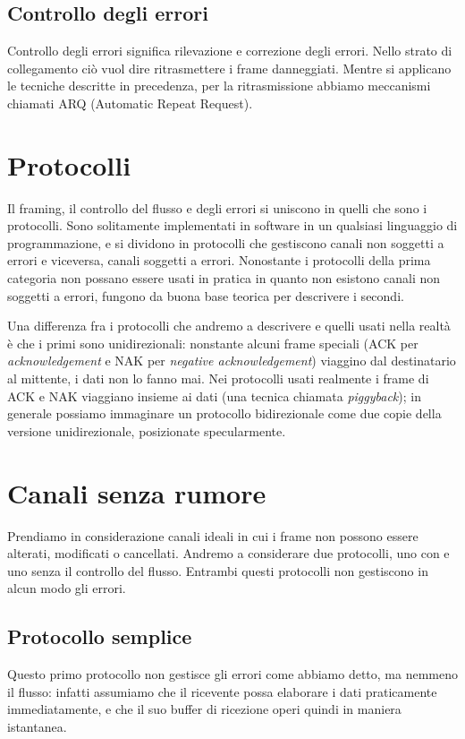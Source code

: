     \subsection{Controllo degli errori}
        Controllo degli errori significa rilevazione e correzione degli errori. Nello strato di collegamento ciò vuol dire ritrasmettere i frame danneggiati. Mentre si applicano le tecniche descritte in precedenza, per la ritrasmissione abbiamo meccanismi chiamati ARQ (Automatic Repeat Request).
        
\section{Protocolli}
    Il framing, il controllo del flusso e degli errori si uniscono in quelli che sono i protocolli. Sono solitamente implementati in software in un qualsiasi linguaggio di programmazione, e si dividono in protocolli che gestiscono canali non soggetti a errori e viceversa, canali soggetti a errori. Nonostante i protocolli della prima categoria non possano essere usati in pratica in quanto non esistono canali non soggetti a errori, fungono da buona base teorica per descrivere i secondi.
    
    Una differenza fra i protocolli che andremo a descrivere e quelli usati nella realtà è che i primi sono unidirezionali: nonstante alcuni frame speciali (ACK per \textit{acknowledgement} e NAK per \textit{negative acknowledgement}) viaggino dal destinatario al mittente, i dati non lo fanno mai. Nei protocolli usati realmente i frame di ACK e NAK viaggiano insieme ai dati (una tecnica chiamata \textit{piggyback}); in generale possiamo immaginare un protocollo bidirezionale come due copie della versione unidirezionale, posizionate specularmente.
    
\section{Canali senza rumore}
    Prendiamo in considerazione canali ideali in cui i frame non possono essere alterati, modificati o cancellati. Andremo a considerare due protocolli, uno con e uno senza il controllo del flusso. Entrambi questi protocolli non gestiscono in alcun modo gli errori.
    
    \subsection{Protocollo semplice}
        Questo primo protocollo non gestisce gli errori come abbiamo detto, ma nemmeno il flusso: infatti assumiamo che il ricevente possa elaborare i dati praticamente immediatamente, e che il suo buffer di ricezione operi quindi in maniera istantanea.
        
